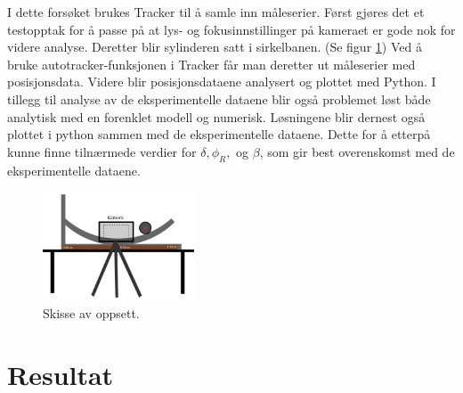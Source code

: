 \documentclass[5p]{elsarticle}
\begin{document}
I dette forsøket brukes Tracker til å samle inn måleserier. 
Først gjøres det et testopptak for å passe på at lys- og fokusinnstillinger på kameraet er gode nok for videre analyse.
Deretter blir sylinderen satt i sirkelbanen. (Se figur \ref{Fig Oppsett})
Ved å bruke autotracker-funksjonen i Tracker får man deretter ut måleserier med posisjonsdata.
Videre blir posisjonsdataene analysert og plottet med Python. 
I tillegg til analyse av de eksperimentelle dataene blir også problemet løst både analytisk med en forenklet modell og numerisk. Løsningene blir dernest også plottet i python sammen med de eksperimentelle dataene. Dette for å etterpå kunne finne tilnærmede verdier for $\delta, \phi_R,$ og $\beta$, som gir best overenskomst med de eksperimentelle dataene.

\begin{figure}[] 
	\begin{center}
		\includegraphics[width=0.4\textwidth]{skisse}
	\end{center}
	\caption{Skisse av oppsett.}
	\label{Fig Oppsett} %
\end{figure}

\section{Resultat}
\end{document}
